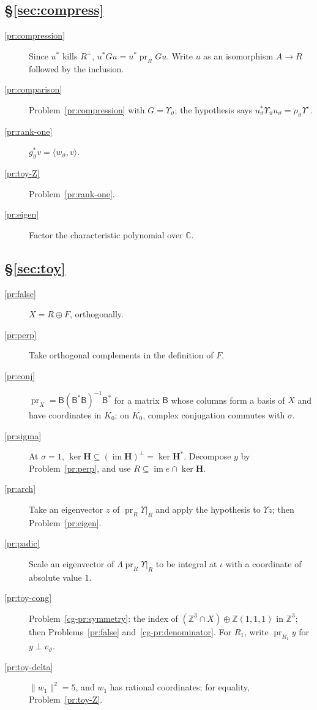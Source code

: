\documentclass[reqno]{amsart}
\theoremstyle{definition}
\theoremstyle{plain}
\theoremstyle{remark}
\newcommand{\Z}{{\mathbb{Z}}}
\newcommand{\C}{{\mathbb{C}}}
\newcommand{\Hb}{{\mathbf{H}}}
\newcommand{\pr}{\operatorname{pr}}
\newcommand{\im}{\operatorname{im}}
\begin{document}
\subsection*{\S\ref{sec:compress}}
\begin{description}
\item[\ref{pr:compression}] Since \(u^*\) kills \(R^\perp\), \(u^*Gu = u^*\pr_R G u\).  Write \(u\) as an isomorphism \(A \to R\) followed by the inclusion.
\item[\ref{pr:comparison}] Problem~\ref{pr:compression} with \(G = \Upsilon_\vartheta\); the hypothesis says \(u_\vartheta^*\Upsilon_\vartheta u_\vartheta = \rho_\vartheta \Upsilon^\circ\).
\item[\ref{pr:rank-one}] \(g_\vartheta^*v = \langle w_\vartheta, v\rangle\).
\item[\ref{pr:toy-Z}] Problem~\ref{pr:rank-one}.
\item[\ref{pr:eigen}] Factor the characteristic polynomial over \(\C\).
\end{description}

\subsection*{\S\ref{sec:toy}}
\begin{description}
\item[\ref{pr:false}] \(X = R \oplus F\), orthogonally.
\item[\ref{pr:perp}] Take orthogonal complements in the definition of \(F\).
\item[\ref{pr:conj}] \(\pr_X = \mathsf B(\mathsf B^*\mathsf B)^{-1}\mathsf B^*\) for a matrix \(\mathsf B\) whose columns form a basis of \(X\) and have coordinates in \(K_0\); on \(K_0\), complex conjugation commutes with \(\sigma\).
\item[\ref{pr:sigma}] At \(\sigma = 1\), \(\ker\Hb \subseteq (\im\Hb)^\perp = \ker\Hb^*\).  Decompose \(y\) by Problem~\ref{pr:perp}, and use \(R \subseteq \im e \cap \ker \Hb\).
\item[\ref{pr:arch}] Take an eigenvector \(z\) of \(\pr_R \Upsilon|_R\) and apply the hypothesis to \(\Upsilon z\); then Problem~\ref{pr:eigen}.
\item[\ref{pr:padic}] Scale an eigenvector of \(\Lambda\pr_R \Upsilon|_R\) to be integral at \(\iota\) with a coordinate of absolute value \(1\).
\item[\ref{pr:toy-cong}] Problem~\ref{cg-pr:symmetry}: the index of \((\Z^3 \cap X) \oplus \Z(1,1,1)\) in \(\Z^3\); then Problems~\ref{pr:false} and~\ref{cg-pr:denominator}.  For \(R_1\), write \(\pr_{R_1}y\) for \(y \perp v_\vartheta\).
\item[\ref{pr:toy-delta}] \(\lVert w_1\rVert^2 = 5\), and \(w_1\) has rational coordinates; for equality, Problem~\ref{pr:toy-Z}.
\end{description}
\end{document}
